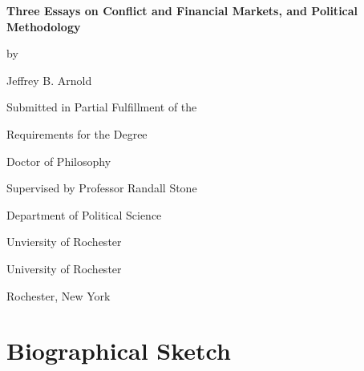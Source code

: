 \documentclass[12pt,oneside]{book}\usepackage[]{graphicx}\usepackage[]{color}
\newcommand{\myauthor}{Jeffrey B. Arnold}
\newcommand{\myinstitution}{University of Rochester}
\newcommand{\mylocation}{Rochester, New York}
\newcommand{\mytitle}{Three Essays on Conflict and Financial Markets, and Political Methodology}
\newcommand{\myadvisor}{Professor Randall Stone}
\newcommand{\myadvisorinstitution}{Unviersity of Rochester}
\newcommand{\myadvisordept}{Department of Political Science}
\newcommand{\myyear}{2016}
\begin{document}
\begin{titlepage}
  \vspace*{\fill}

  \begin{center}
    {\LARGE \bfseries \mytitle \par}

    \bigskip%
    by

    \bigskip%
    \myauthor


    \bigskip\bigskip\bigskip\bigskip%
    Submitted in Partial Fulfillment of the

    \bigskip%
    Requirements for the Degree

    \bigskip%
    Doctor of Philosophy


    \bigskip\bigskip\bigskip\bigskip%
    Supervised by \myadvisor{}

    \bigskip\bigskip%
    \myadvisordept{}

    \bigskip%
    \myadvisorinstitution{}


    \bigskip\bigskip\bigskip\bigskip%
    \myinstitution

    \bigskip%
    \mylocation{}


    \bigskip\bigskip\bigskip\bigskip%
    \myyear{}
  \end{center}

  \vspace*{\fill}
\end{titlepage}



\pagestyle{fancy}
\setcounter{page}{2}
\doublespacing


%   

\clearpage


\chapter*{Biographical Sketch}

\end{document}
